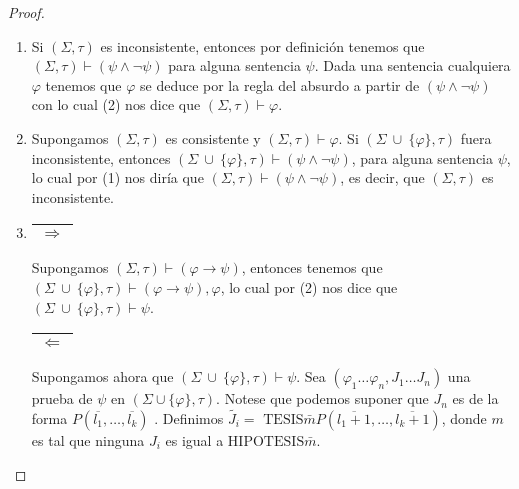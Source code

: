 \begin{proof}
\begin{enumerate}[(1)]
      \item Si $(\Sigma, \tau)$ es inconsistente, entonces por definición tenemos que $(\Sigma, \tau) \vdash (\psi
        \wedge \lnot \psi)$ para alguna sentencia $\psi$. Dada una sentencia cualquiera $\varphi$ tenemos que $\varphi$
        se deduce por la regla del absurdo a partir de $(\psi \wedge \lnot \psi)$ con lo cual (2) nos dice que $(\Sigma,
        \tau) \vdash \varphi$.

      \item Supongamos $(\Sigma, \tau)$ es consistente y $(\Sigma, \tau) \vdash \varphi$. Si $(\Sigma \ \cup \
        \{\varphi\}, \tau)$ fuera inconsistente, entonces $(\Sigma \ \cup \ \{\varphi\}, \tau) \vdash (\psi \wedge \lnot
        \psi)$, para alguna sentencia $\psi$, lo cual por (1) nos diría que $(\Sigma, \tau) \vdash (\psi \wedge \lnot
        \psi)$, es decir, que $(\Sigma, \tau)$ es inconsistente.

      \item \PN \begin{tabular}{|c|} \hline $\Rightarrow$ \\\hline \end{tabular} Supongamos $(\Sigma, \tau) \vdash
        (\varphi \rightarrow \psi)$, entonces tenemos que $(\Sigma \ \cup \ \{\varphi\}, \tau) \vdash (\varphi
        \rightarrow \psi), \varphi$, lo cual por (2) nos dice que $(\Sigma \ \cup \ \{\varphi\}, \tau) \vdash \psi$.

        \PN \begin{tabular}{|c|} \hline $\Leftarrow$ \\\hline \end{tabular} Supongamos ahora que $(\Sigma \ \cup \
          \{\varphi\}, \tau) \vdash \psi$. Sea $(\varphi_{1} \dotsc \varphi_{n}, J_{1} \dotsc J_{n})$ una prueba de
          $\psi$ en $(\Sigma \cup \{\varphi\}, \tau)$. Notese que podemos suponer que $J_{n}$ es de la forma
          $P(\overline{l_{1}}, \dotsc, \overline{l_{k}})$ . Definimos $\widetilde{J_{i}} = $ $\mathrm{TESIS}\bar{m}
          P(\overline{l_{1}+1} , \dotsc, \overline{l_{k}+1})$, donde $m$ es tal que ninguna $J_{i}$ es igual a
          $\mathrm{HIPOTESIS}\bar{m}$.


\end{enumerate}
\end{proof}
